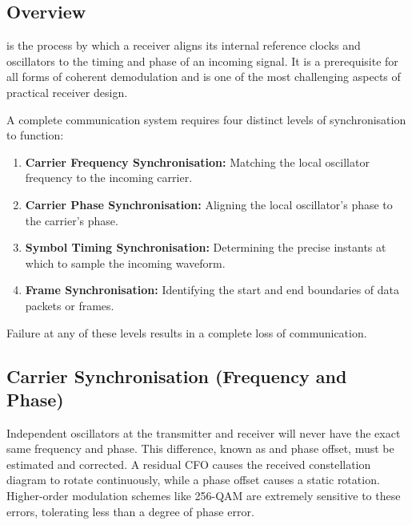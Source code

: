 \subsection{Overview}

 is the process by which a receiver aligns its internal reference clocks and oscillators to the timing and phase of an incoming signal. It is a prerequisite for all forms of coherent demodulation and is one of the most challenging aspects of practical receiver design.

\begin{keyconcept}
    A complete communication system requires four distinct levels of synchronisation to function:
    \begin{enumerate}
        \item \textbf{Carrier Frequency Synchronisation:} Matching the local oscillator frequency to the incoming carrier.
        \item \textbf{Carrier Phase Synchronisation:} Aligning the local oscillator's phase to the carrier's phase.
        \item \textbf{Symbol Timing Synchronisation:} Determining the precise instants at which to sample the incoming waveform.
        \item \textbf{Frame Synchronisation:} Identifying the start and end boundaries of data packets or frames.
    \end{enumerate}
    Failure at any of these levels results in a complete loss of communication.
\end{keyconcept}


\subsection{Carrier Synchronisation (Frequency and Phase)}

Independent oscillators at the transmitter and receiver will never have the exact same frequency and phase. This difference, known as  and phase offset, must be estimated and corrected. A residual CFO causes the received constellation diagram to rotate continuously, while a phase offset causes a static rotation. Higher-order modulation schemes like 256-QAM are extremely sensitive to these errors, tolerating less than a degree of phase error.

